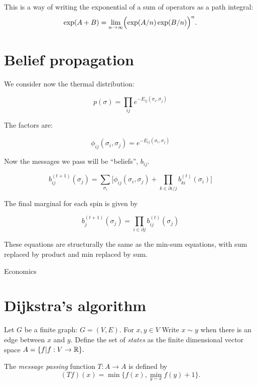 \documentclass[11pt]{article}
\begin{document}
This is a way of writing the exponential of a sum of operators
as a path integral:
$$
\exp(A+B) = \lim_{n\to\infty} \Bigl(\exp(A/n)\exp(B/n)\Bigr)^n.
$$
 

\section{Belief propagation}



We consider now the thermal distribution:

$$
    p(\sigma) = \prod_{ij} e^{-E_{ij}(\sigma_i, \sigma_j)}
$$

The factors are:

$$
\phi_{ij}(\sigma_i, \sigma_j) = e^{-E_{ij}(\sigma_i, \sigma_j)}
$$

Now the messages we pass will be ``beliefs'', $b_{ij}$.

$$
b_{ij}^{(t+1)}(\sigma_j) = \sum_{\sigma_i}\bigl[ \phi_{ij}(\sigma_i, \sigma_j)
  + \prod_{k\in \partial i/j} b_{ki}^{(t)}(\sigma_i) \bigr]
$$

The final marginal for each spin is given by

$$
    b_j^{(t+1)}(\sigma_j) = \prod_{i\in \partial j} b_{ij}^{(t)}(\sigma_j)
$$

These equations are structurally the same as the
min-sum equations, with sum replaced by product and
min replaced by sum.




Economics


%
%

\section{Dijkstra's algorithm}

Let $G$ be a finite graph: $G = (V, E).$
For $x,y\in V$ Write $x\sim y$ when there
is an edge between $x$ and $y.$ %
Define the set of \emph{states} as %
the finite dimensional vector space
$A = \{ f | f : V \to \mathbb R \}.$

The \emph{message passing} function
$T:A\to A$ is defined by
$$(Tf)(x) = \min\{f(x), \min_{y\sim x} f(y)+1\}.$$
\end{document}
